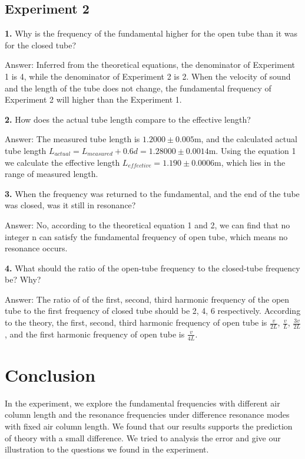 \documentclass[12pt]{article}
\begin{document}
	\subsection{Experiment 2}
	\textbf{1.} Why is the frequency of the fundamental higher for the open tube than it was for the closed tube? \par 
	Answer: Inferred from the theoretical equations, the denominator of Experiment 1 is 4, while the denominator of Experiment 2 is 2. When the velocity of sound and the length of the tube does not change, the fundamental frequency of Experiment 2 will higher than the Experiment 1. \par
	\textbf{2.} How does the actual tube length compare to the effective length?\par 
	Answer: The measured tube length is $ 1.2000\pm0.005 $m, and the calculated actual tube length $ L_{actual} = L_{measured}+0.6d = 1.28000\pm0.0014$m. Using the equation 1 we calculate the effective length $ L_{effective} = 1.190\pm0.0006 $m, which lies in the range of measured length.\par
	\textbf{3.} When the frequency was returned to the fundamental, and the end of the tube was closed, was it still in resonance?\par
	Answer: No, according to the theoretical equation 1 and 2, we can find that no integer n can satisfy the fundamental frequency of open tube, which means no resonance occurs.\par
	\textbf{4.} What should the ratio of the open-tube frequency to the closed-tube frequency be? Why?\par 
	Answer: The ratio of of the first, second, third harmonic frequency of the open tube to the first frequency of closed tube should be 2, 4, 6 respectively. According to the theory, the first, second, third harmonic frequency of open tube is $ \frac{v}{2L} $, $ \frac{v}{L} $, $ \frac{3v}{2L} $, and the first harmonic frequency of open tube is $ \frac{v}{4L} $.
	\section{Conclusion}
	In the experiment, we explore the fundamental frequencies with different air column length and the resonance frequencies under difference resonance modes with fixed air column length. We found that our results supports the prediction of theory with a small difference. We tried to analysis the error and give our illustration to the questions we found in the experiment.
	
\end{document}
